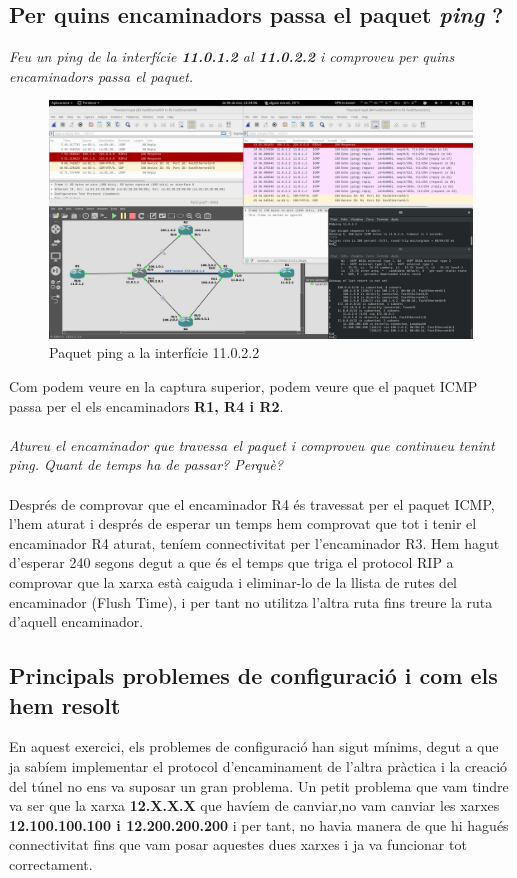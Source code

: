\documentclass[10pt]{article}
\begin{document}
\subsection{Per quins encaminadors passa el paquet \emph{ping} ?}
\emph{Feu un ping de la interfície \textbf{11.0.1.2} al \textbf{11.0.2.2} i comproveu per quins encaminadors passa el paquet.}
\begin{figure}[H]
\begin{center}
\includegraphics[scale=0.24]{Images/part2Ex1.png}
\caption{Paquet ping a la interfície 11.0.2.2}
\end{center}
\end{figure}
Com podem veure en la captura superior, podem veure que el paquet ICMP passa per el els encaminadors \textbf{R1, R4 i R2}.
\\\\
\emph{Atureu el encaminador que travessa el paquet i comproveu que continueu tenint ping. Quant de temps ha de passar? Perquè?}\\\\
Després de comprovar que el encaminador R4 és travessat per el paquet ICMP, l'hem aturat i després de esperar un temps hem comprovat que tot i tenir el encaminador R4 aturat, teníem connectivitat per l'encaminador R3. Hem hagut d'esperar 240 segons degut a que és el temps que triga el protocol RIP a comprovar que la xarxa està caiguda i eliminar-lo de la llista de rutes del encaminador (Flush Time), i per tant no utilitza l'altra ruta fins treure la ruta d'aquell encaminador.
\subsection{Principals problemes de configuració i com els hem resolt}
En aquest exercici, els problemes de configuració han sigut mínims, degut a que ja sabíem implementar el protocol d'encaminament de l'altra pràctica i la creació del túnel no ens va suposar un gran problema. Un petit problema que vam tindre va ser que la xarxa \textbf{12.X.X.X} que havíem de canviar,no vam canviar les xarxes \textbf{12.100.100.100 i 12.200.200.200} i per tant, no havia manera de que hi hagués connectivitat fins que vam posar aquestes dues xarxes i ja va funcionar tot correctament.
\newpage
\end{document}
